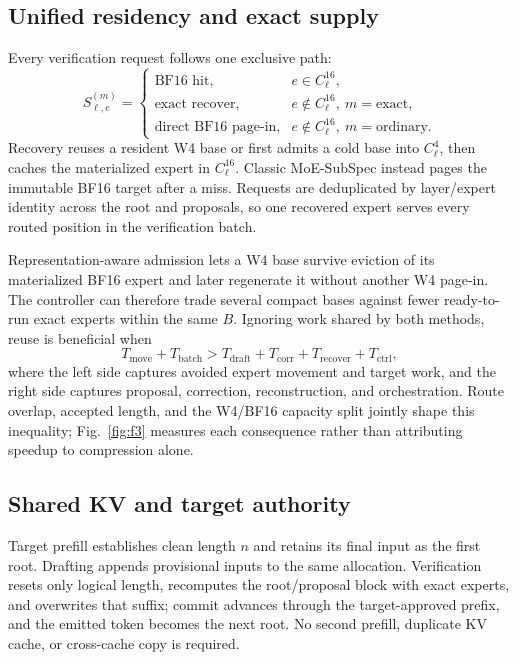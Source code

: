 \subsection{Unified residency and exact supply}

Every verification request follows one exclusive path:
\begin{equation}
S^{(m)}_{\ell,e}=\begin{cases}
\text{BF16 hit}, & e\in C^{16}_{\ell},\\
\text{exact recover}, & e\notin C^{16}_{\ell},\ m=\mathrm{exact},\\
\text{direct BF16 page-in}, & e\notin C^{16}_{\ell},\ m=\mathrm{ordinary}.
\end{cases}
\label{eq:supply}
\end{equation}
Recovery reuses a resident W4 base or first admits a cold base into $C^4_{\ell}$,
then caches the materialized expert in $C^{16}_{\ell}$. Classic MoE-SubSpec instead
pages the immutable BF16 target after a miss. Requests are deduplicated by
layer/expert identity across the root and proposals, so one recovered expert serves
every routed position in the verification batch.

Representation-aware admission lets a W4 base survive eviction of its materialized
BF16 expert and later regenerate it without another W4 page-in. The controller can
therefore trade several compact bases against fewer ready-to-run exact experts within
the same $B$. Ignoring work shared by both methods, reuse is beneficial when
\begin{equation}
T_{\mathrm{move}}+T_{\mathrm{batch}}>
T_{\mathrm{draft}}+T_{\mathrm{corr}}+T_{\mathrm{recover}}+T_{\mathrm{ctrl}},
\label{eq:benefit}
\end{equation}
where the left side captures avoided expert movement and target work, and the right
side captures proposal, correction, reconstruction, and orchestration. Route overlap,
accepted length, and the W4/BF16 capacity split jointly shape this inequality;
Fig.~\ref{fig:f3} measures each consequence rather than attributing speedup to
compression alone.

\subsection{Shared KV and target authority}

Target prefill establishes clean length $n$ and retains its final input as the first
root. Drafting appends provisional inputs to the same allocation. Verification resets
only logical length, recomputes the root/proposal block with exact experts, and
overwrites that suffix; commit advances through the target-approved prefix, and the
emitted token becomes the next root. No second prefill, duplicate KV cache, or
cross-cache copy is required.

